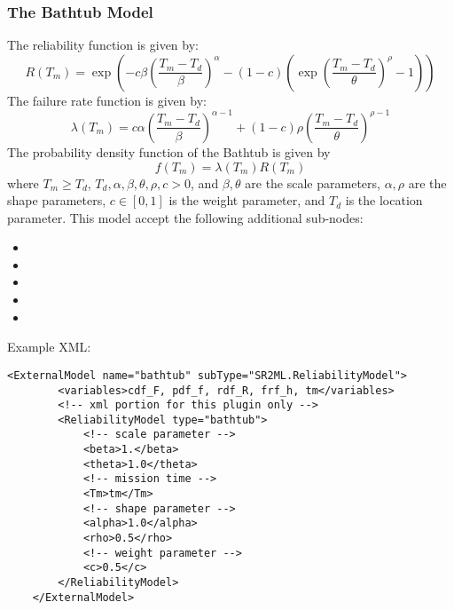 \subsubsection{The Bathtub Model}
The reliability function is given by:
\begin{equation}
  R(T_m) = \exp\left(-c\beta\left(\frac{T_m-T_d}{\beta}\right)^\alpha -(1-c)\left(\exp\left(\frac{T_m-T_d}{\theta}\right)^\rho -1\right)\right)
\end{equation}
The failure rate function is given by:
\begin{equation}
  \lambda(T_m) = c\alpha\left(\frac{T_m-T_d}{\beta}\right)^{\alpha-1}+(1-c)\rho\left(\frac{T_m-T_d}{\theta}\right)^{\rho-1}
\end{equation}
The probability density function of the Bathtub is given by
\begin{equation}
	f(T_m) = \lambda(T_m) R(T_m)
\end{equation}
where $T_m\geq T_d$, $T_d, \alpha, \beta, \theta, \rho, c >0$, and $\beta, \theta$ are the scale parameters,
$\alpha, \rho$ are the shape parameters, $c \in [0,1]$ is the weight parameter, and $T_d$ is the location parameter.
This model accept the following additional sub-nodes:
\begin{itemize}
	\item {}
	\item {}
	\item {}
	\item {}
	\item {}
\end{itemize}

Example XML:
\begin{lstlisting}[style=XML]
	<ExternalModel name="bathtub" subType="SR2ML.ReliabilityModel">
		<variables>cdf_F, pdf_f, rdf_R, frf_h, tm</variables>
		<!-- xml portion for this plugin only -->
		<ReliabilityModel type="bathtub">
			<!-- scale parameter -->
			<beta>1.</beta>
			<theta>1.0</theta>
			<!-- mission time -->
			<Tm>tm</Tm>
			<!-- shape parameter -->
			<alpha>1.0</alpha>
			<rho>0.5</rho>
			<!-- weight parameter -->
			<c>0.5</c>
		</ReliabilityModel>
	</ExternalModel>
\end{lstlisting}



